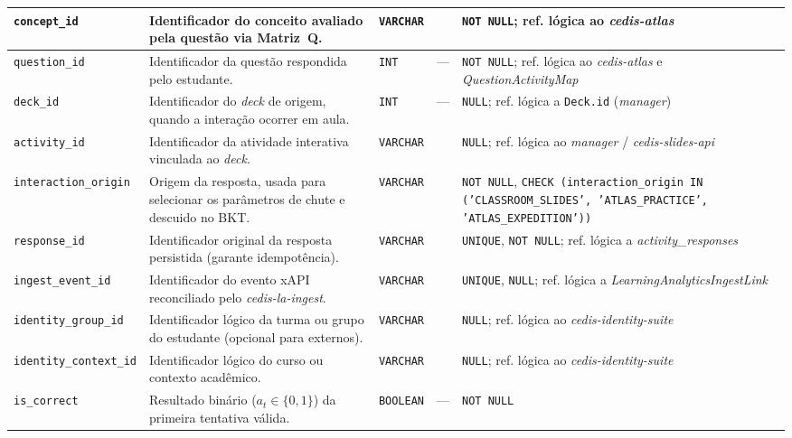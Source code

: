 \begin{anexosenv}
{\begin{longtable}{>{\raggedright\arraybackslash}p{3.0cm}>{\raggedright\arraybackslash}p{4.9cm}>{\raggedright\arraybackslash}p{1.75cm}>{\centering\arraybackslash}p{0.95cm}>{\raggedright\arraybackslash}p{3.7cm}}
\hline
\texttt{concept\_\allowbreak id} & Identificador do conceito avaliado pela questão via Matriz~Q. & \texttt{VARCHAR} & 128 & \texttt{NOT NULL}; ref. lógica ao \textit{cedis-atlas} \\
\hline
\texttt{question\_\allowbreak id} & Identificador da questão respondida pelo estudante. & \texttt{INT} & --- & \texttt{NOT NULL}; ref. lógica ao \textit{cedis-atlas} e \textit{QuestionActivityMap} \\
\hline
\texttt{deck\_\allowbreak id} & Identificador do \textit{deck} de origem, quando a interação ocorrer em aula. & \texttt{INT} & --- & \texttt{NULL}; ref. lógica a \texttt{Deck.id} (\textit{manager}) \\
\hline
\texttt{activity\_\allowbreak id} & Identificador da atividade interativa vinculada ao \textit{deck}. & \texttt{VARCHAR} & 128 & \texttt{NULL}; ref. lógica ao \textit{manager} / \textit{cedis-slides-api} \\
\hline
\texttt{interaction\_\allowbreak origin} & Origem da resposta, usada para selecionar os parâmetros de chute e descuido no BKT. & \texttt{VARCHAR} & 50 & \texttt{NOT NULL}, \texttt{CHECK (interaction\_\allowbreak origin IN ('CLASSROOM\_\allowbreak SLIDES', 'ATLAS\_\allowbreak PRACTICE', 'ATLAS\_\allowbreak EXPEDITION'))} \\
\hline
\texttt{response\_\allowbreak id} & Identificador original da resposta persistida (garante idempotência). & \texttt{VARCHAR} & 128 & \texttt{UNIQUE}, \texttt{NOT NULL}; ref. lógica a \textit{activity\_\allowbreak responses} \\
\hline
\texttt{ingest\_\allowbreak event\_\allowbreak id} & Identificador do evento xAPI reconciliado pelo \textit{cedis-la-ingest}. & \texttt{VARCHAR} & 128 & \texttt{UNIQUE}, \texttt{NULL}; ref. lógica a \textit{LearningAnalyticsIngestLink} \\
\hline
\texttt{identity\_\allowbreak group\_\allowbreak id} & Identificador lógico da turma ou grupo do estudante (opcional para externos). & \texttt{VARCHAR} & 128 & \texttt{NULL}; ref. lógica ao \textit{cedis-identity-suite} \\
\hline
\texttt{identity\_\allowbreak context\_\allowbreak id} & Identificador lógico do curso ou contexto acadêmico. & \texttt{VARCHAR} & 128 & \texttt{NULL}; ref. lógica ao \textit{cedis-identity-suite} \\
\hline
\texttt{is\_\allowbreak correct} & Resultado binário ($a_t \in \{0, 1\}$) da primeira tentativa válida. & \texttt{BOOLEAN} & --- & \texttt{NOT NULL} \\

\end{longtable}}
\end{anexosenv}
